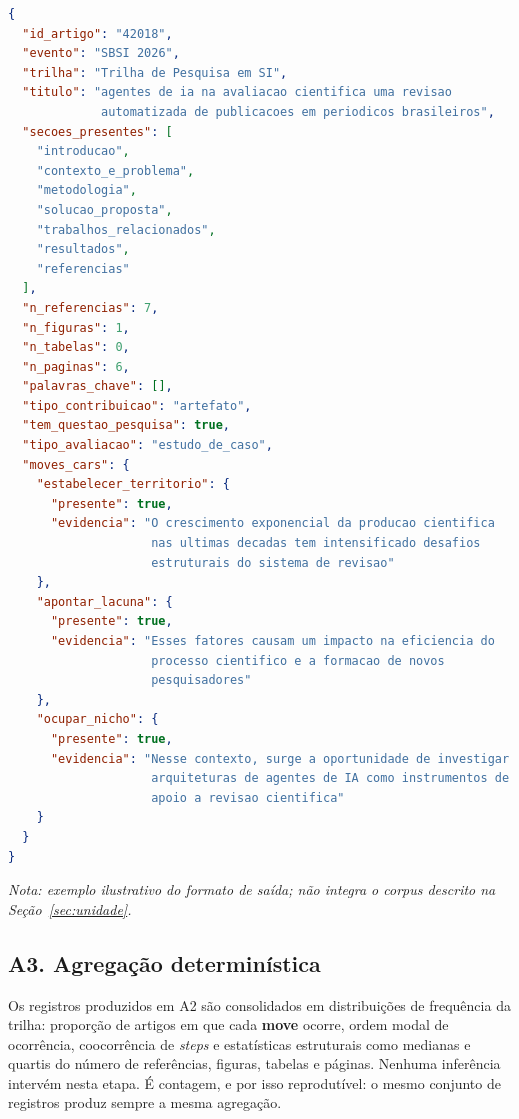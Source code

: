 \noindent\begin{minipage}{\linewidth}
\begin{lstlisting}[language=json, basicstyle=\scriptsize\ttfamily, caption={Exemplo do esquema estruturado produzido em A2}, label={lst:trilha}]
{
  "id_artigo": "42018",
  "evento": "SBSI 2026",
  "trilha": "Trilha de Pesquisa em SI",
  "titulo": "agentes de ia na avaliacao cientifica uma revisao
             automatizada de publicacoes em periodicos brasileiros",
  "secoes_presentes": [
    "introducao",
    "contexto_e_problema",
    "metodologia",
    "solucao_proposta",
    "trabalhos_relacionados",
    "resultados",
    "referencias"
  ],
  "n_referencias": 7,
  "n_figuras": 1,
  "n_tabelas": 0,
  "n_paginas": 6,
  "palavras_chave": [],
  "tipo_contribuicao": "artefato",
  "tem_questao_pesquisa": true,
  "tipo_avaliacao": "estudo_de_caso",
  "moves_cars": {
    "estabelecer_territorio": {
      "presente": true,
      "evidencia": "O crescimento exponencial da producao cientifica
                    nas ultimas decadas tem intensificado desafios
                    estruturais do sistema de revisao"
    },
    "apontar_lacuna": {
      "presente": true,
      "evidencia": "Esses fatores causam um impacto na eficiencia do
                    processo cientifico e a formacao de novos
                    pesquisadores"
    },
    "ocupar_nicho": {
      "presente": true,
      "evidencia": "Nesse contexto, surge a oportunidade de investigar
                    arquiteturas de agentes de IA como instrumentos de
                    apoio a revisao cientifica"
    }
  }
}
\end{lstlisting}
\vspace{2pt}
{\footnotesize\textit{Nota: exemplo ilustrativo do formato de saída; não integra o corpus descrito na Seção~\ref{sec:unidade}.}}
\end{minipage}

\subsection*{A3. Agregação determinística}

Os registros produzidos em A2 são consolidados em distribuições de frequência da trilha: proporção de artigos em que cada \textbf{move} ocorre, ordem modal de ocorrência, coocorrência de \textit{steps} e estatísticas estruturais como medianas e quartis do número de referências, figuras, tabelas e páginas. Nenhuma inferência intervém nesta etapa. É contagem, e por isso reprodutível: o mesmo conjunto de registros produz sempre a mesma agregação.

